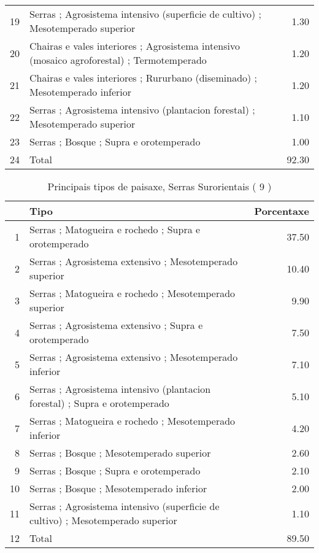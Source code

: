 \begin{table}[p]
\begin{tabular}{rlr}
  19 & Serras ; Agrosistema intensivo (superficie de cultivo) ; Mesotemperado superior & 1.30 \\ 
  20 & Chairas e vales interiores ; Agrosistema intensivo (mosaico agroforestal) ; Termotemperado & 1.20 \\ 
  21 & Chairas e vales interiores ; Rururbano (diseminado) ; Mesotemperado inferior & 1.20 \\ 
  22 & Serras ; Agrosistema intensivo (plantacion forestal) ; Mesotemperado superior & 1.10 \\ 
  23 & Serras ; Bosque ; Supra e orotemperado & 1.00 \\ 
  24 & Total & 92.30 \\ 
   \hline
\end{tabular}
\end{table}
\begin{table}[p]
\centering
\caption{Principais tipos de paisaxe,  Serras Surorientais ( 9 )} 
\label{Tipos 9}
\begin{tabular}{rlr}
  \hline
 & Tipo & Porcentaxe \\ 
  \hline
1 & Serras ; Matogueira e rochedo ; Supra e orotemperado & 37.50 \\ 
  2 & Serras ; Agrosistema extensivo ; Mesotemperado superior & 10.40 \\ 
  3 & Serras ; Matogueira e rochedo ; Mesotemperado superior & 9.90 \\ 
  4 & Serras ; Agrosistema extensivo ; Supra e orotemperado & 7.50 \\ 
  5 & Serras ; Agrosistema extensivo ; Mesotemperado inferior & 7.10 \\ 
  6 & Serras ; Agrosistema intensivo (plantacion forestal) ; Supra e orotemperado & 5.10 \\ 
  7 & Serras ; Matogueira e rochedo ; Mesotemperado inferior & 4.20 \\ 
  8 & Serras ; Bosque ; Mesotemperado superior & 2.60 \\ 
  9 & Serras ; Bosque ; Supra e orotemperado & 2.10 \\ 
  10 & Serras ; Bosque ; Mesotemperado inferior & 2.00 \\ 
  11 & Serras ; Agrosistema intensivo (superficie de cultivo) ; Mesotemperado superior & 1.10 \\ 
  12 & Total & 89.50 \\ 
   \hline
\end{tabular}
\end{table}
